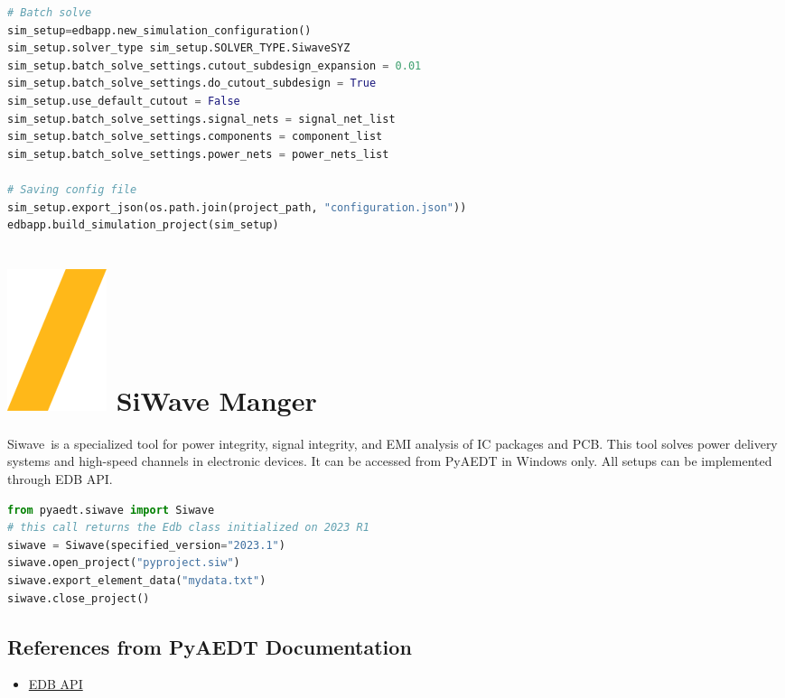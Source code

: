 \documentclass[landscape]{article}
\begin{document}
\begin{multicols}{3}
\begin{lstlisting}[language=Python]
# Batch solve
sim_setup=edbapp.new_simulation_configuration()
sim_setup.solver_type sim_setup.SOLVER_TYPE.SiwaveSYZ
sim_setup.batch_solve_settings.cutout_subdesign_expansion = 0.01
sim_setup.batch_solve_settings.do_cutout_subdesign = True
sim_setup.use_default_cutout = False
sim_setup.batch_solve_settings.signal_nets = signal_net_list
sim_setup.batch_solve_settings.components = component_list
sim_setup.batch_solve_settings.power_nets = power_nets_list

# Saving config file
sim_setup.export_json(os.path.join(project_path, "configuration.json"))
edbapp.build_simulation_project(sim_setup)
\end{lstlisting}
\section{\includegraphics[height=\fontcharht\font`\S]{slash.png} SiWave Manger}
Siwave is a specialized tool for power integrity, signal integrity, and EMI analysis of IC packages and PCB. This tool solves power delivery systems and high-speed channels in electronic devices. It can be accessed from PyAEDT in Windows only. All setups can be implemented through EDB API.
\begin{lstlisting}[language=Python]
from pyaedt.siwave import Siwave
# this call returns the Edb class initialized on 2023 R1
siwave = Siwave(specified_version="2023.1")
siwave.open_project("pyproject.siw")
siwave.export_element_data("mydata.txt")
siwave.close_project()
\end{lstlisting}


\subsection{References from PyAEDT Documentation}
\begin{itemize}
\item \href{https://aedt.docs.pyansys.com/version/stable/EDBAPI/index.html}{EDB API}
\end{itemize}
\end{multicols}
\vspace{-0.15cm}
\end{document}
